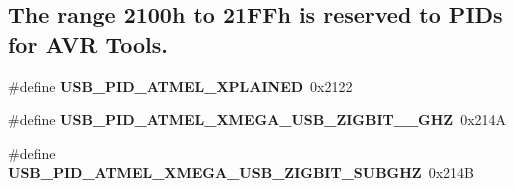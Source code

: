 \subsection*{The range 2100h to 21\-F\-Fh is reserved to P\-I\-Ds for A\-V\-R Tools.}
\begin{DoxyCompactItemize}
\item 
\hypertarget{group__usb__atmel__ids__group_ga482b37d2c4bd42852c448308f5e864fd}{\#define {\bfseries U\-S\-B\-\_\-\-P\-I\-D\-\_\-\-A\-T\-M\-E\-L\-\_\-\-X\-P\-L\-A\-I\-N\-E\-D}~0x2122}\label{group__usb__atmel__ids__group_ga482b37d2c4bd42852c448308f5e864fd}

\item 
\hypertarget{group__usb__atmel__ids__group_gab2dd8f2835193cbf5b073e8845d5d3db}{\#define {\bfseries U\-S\-B\-\_\-\-P\-I\-D\-\_\-\-A\-T\-M\-E\-L\-\_\-\-X\-M\-E\-G\-A\-\_\-\-U\-S\-B\-\_\-\-Z\-I\-G\-B\-I\-T\-\_\-\_\-G\-H\-Z}~0x214\-A}\label{group__usb__atmel__ids__group_gab2dd8f2835193cbf5b073e8845d5d3db}

\item 
\hypertarget{group__usb__atmel__ids__group_ga94f805b5e36204a9bdeb37429128a84f}{\#define {\bfseries U\-S\-B\-\_\-\-P\-I\-D\-\_\-\-A\-T\-M\-E\-L\-\_\-\-X\-M\-E\-G\-A\-\_\-\-U\-S\-B\-\_\-\-Z\-I\-G\-B\-I\-T\-\_\-\-S\-U\-B\-G\-H\-Z}~0x214\-B}\label{group__usb__atmel__ids__group_ga94f805b5e36204a9bdeb37429128a84f}

\end{DoxyCompactItemize}
